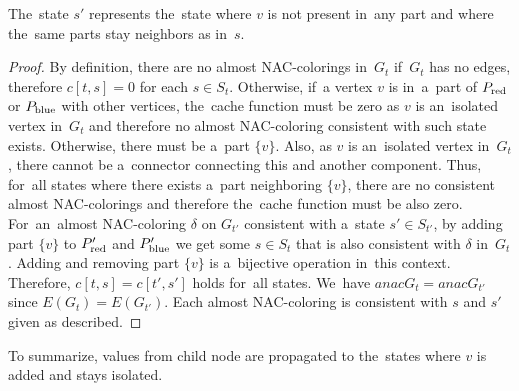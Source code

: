%
The~state \( s' \) represents the~state where \( v \) is not present in~any part
and where the~same parts stay neighbors as in~\( s \).
%
\begin{proof}
	By definition, there are no almost NAC-colorings
	in~\( G_t \) if~\( G_t \) has no edges,
	therefore \( c[t, s] = 0 \) for each \( s \in S_t \).
	Otherwise, if~a vertex \( v \) is in~a~part of \( P_{\text{red}} \) or \( P_{\text{blue}} \) with other vertices,
	the~cache function must be zero as \( v \) is an~isolated vertex in~\( G_t \)
	and therefore no almost NAC-coloring consistent with such state exists.
	Otherwise, there must be a~part \( \{v\} \).
	Also, as \( v \) is an~isolated vertex in~\( G_t \), there cannot be a~connector
	connecting this and another component.
	Thus, for~all states where there exists
	a~part neighboring \( \{v\} \), there are no consistent almost NAC-colorings
	and therefore the~cache function must be also zero.
	For~an~almost NAC-coloring \( \delta \) on \( G_{t'} \) consistent with
	a~state \( s' \in S_{t'} \),
	by adding part \( \{v\} \) to \( P_{\text{red}}' \) and \( P_{\text{blue}}' \)
	we get some \( s \in S_t \) that is also consistent with \( \delta \) in~\( G_t \).
	Adding and removing part \( \{v\} \) is a~bijective operation in~this context.
	Therefore, \( c[t, s] = c[t', s'] \) holds for~all states.
	We~have \( anac{G_t} = anac{G_{t'}} \) since \( E(G_t) = E(G_{t'}) \).
	Each almost NAC-coloring is consistent
	with \( s \) and \( s' \) given as described.
\end{proof}
%
To summarize, values from child node are propagated to the~states
where \( v \) is added and stays isolated.


